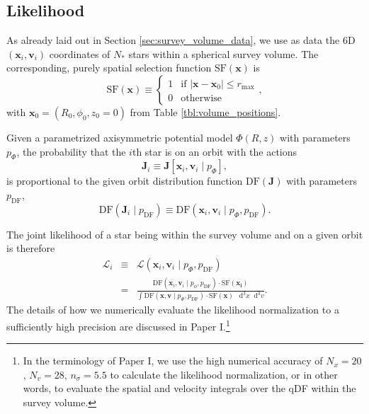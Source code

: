 \documentclass[iop,revtex4,numberedappendix,appendixfloats]{emulateapj}
\newcommand{\vect}[1]{\boldsymbol{#1}}
\newcommand*\Diff[1]{\mathop{}\!\mathrm{d^#1}}
\begin{document}
\subsection{Likelihood} \label{sec:likelihood}

As already laid out in Section \ref{sec:survey_volume_data}, we use as data the 6D $(\vect{x}_i,\vect{v}_i)$ coordinates of $N_*$ stars within a spherical survey volume. The corresponding, purely spatial selection function $\text{SF}(\vect{x})$ is
\begin{equation}
\text{SF}(\vect{x}) \equiv \begin{cases} 1 &\mbox{if } \left| \vect{x}-\vect{x}_0 \right| \leq r_\text{max} \\
0 & \mbox{otherwise} \end{cases}, \label{eq:selection_function}
\end{equation}
with $\vect{x}_0 = (R_0,\phi_0,z_0=0)$ from Table \ref{tbl:volume_positions}.

Given a parametrized axisymmetric potential model $\Phi(R,z)$ with parameters $p_\Phi$, the probability that the $i$th star is on an orbit with the actions 
\begin{equation}
\vect{J}_i \equiv \vect{J}[\vect{x}_i,\vect{v}_i \mid p_\Phi],
\end{equation}
is proportional to the given orbit distribution function $\text{DF}(\vect{J})$ with parameters $p_\text{DF}$,
\begin{equation}
\text{DF}(\vect{J}_i \mid p_\text{DF}) \equiv \text{DF}(\vect{x}_i,\vect{v}_i \mid p_\Phi,p_\text{DF}).
\end{equation}

The joint likelihood of a star being within the survey volume and on a given orbit is therefore
\begin{eqnarray}
\mathscr{L}_i &\equiv& \mathscr{L}(\vect{x}_i,\vect{v}_i \mid p_\Phi,p_\text{DF}) \nonumber\\
&=& \frac{\text{DF}(\vect{x}_i,\vect{v}_i\mid p_\phi, p_\text{DF}) \cdot \text{SF}(\vect{x_i})}{\int \text{DF}(\vect{x},\vect{v}\mid p_\Phi, p_\text{DF}) \cdot \text{SF}(\vect{x}) \ \Diff3 x \Diff3 v}.
\end{eqnarray}
The details of how we numerically evaluate the likelihood normalization to a sufficiently high precision are discussed in Paper I.\footnote{In the terminology of Paper I, we use the high numerical accuracy of $N_x = 20$, $N_v = 28$, $n_\sigma = 5.5$ to calculate the likelihood normalization, or in other words, to evaluate the spatial and velocity integrals over the qDF within the survey volume.}
\end{document}
